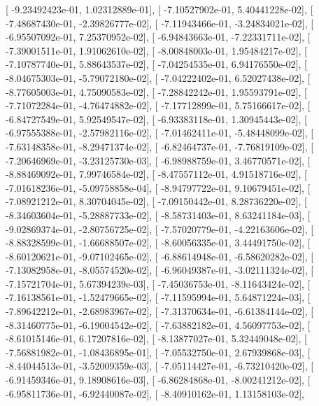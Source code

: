 \documentclass{article}
\begin{document}
       [ -9.23492423e-01,   1.02312889e-01],
       [ -7.10527902e-01,   5.40441228e-02],
       [ -7.48687430e-01,  -2.39826777e-02],
       [ -7.11943466e-01,  -3.24834021e-02],
       [ -6.95507092e-01,   7.25370952e-02],
       [ -6.94843663e-01,  -7.22331711e-02],
       [ -7.39001511e-01,   1.91062610e-02],
       [ -8.00848003e-01,   1.95484217e-02],
       [ -7.10787740e-01,   5.88643537e-02],
       [ -7.04254535e-01,   6.94176550e-02],
       [ -8.04675303e-01,  -5.79072180e-02],
       [ -7.04222402e-01,   6.52027438e-02],
       [ -8.77605003e-01,   4.75090583e-02],
       [ -7.28842242e-01,   1.95593791e-02],
       [ -7.71072284e-01,  -4.76474882e-02],
       [ -7.17712899e-01,   5.75166617e-02],
       [ -6.84727549e-01,   5.92549547e-02],
       [ -6.93383118e-01,   1.30945443e-02],
       [ -6.97555388e-01,  -2.57982116e-02],
       [ -7.01462411e-01,  -5.48448099e-02],
       [ -7.63148358e-01,  -8.29471374e-02],
       [ -6.82464737e-01,  -7.76819109e-02],
       [ -7.20646969e-01,  -3.23125730e-03],
       [ -6.98988759e-01,   3.46770571e-02],
       [ -8.88469092e-01,   7.99746584e-02],
       [ -8.47557112e-01,   4.91518716e-02],
       [ -7.01618236e-01,  -5.09758858e-04],
       [ -8.94797722e-01,   9.10679451e-02],
       [ -7.08921212e-01,   8.30704045e-02],
       [ -7.09150442e-01,   8.28736220e-02],
       [ -8.34603604e-01,  -5.28887733e-02],
       [ -8.58731403e-01,   8.63241184e-03],
       [ -9.02869374e-01,  -2.80756725e-02],
       [ -7.57020779e-01,  -4.22163606e-02],
       [ -8.88328599e-01,  -1.66688507e-02],
       [ -8.60056335e-01,   3.44491750e-02],
       [ -8.60120621e-01,  -9.07102465e-02],
       [ -6.88614948e-01,  -6.58620282e-02],
       [ -7.13082958e-01,  -8.05574520e-02],
       [ -6.96049387e-01,  -3.02111324e-02],
       [ -7.15721704e-01,   5.67394239e-03],
       [ -7.45036753e-01,  -8.11643424e-02],
       [ -7.16138561e-01,  -1.52479665e-02],
       [ -7.11595994e-01,   5.64871224e-03],
       [ -7.89642212e-01,  -2.68983967e-02],
       [ -7.31370634e-01,  -6.61384144e-02],
       [ -8.31460775e-01,  -6.19004542e-02],
       [ -7.63882182e-01,   4.56097753e-02],
       [ -8.61015146e-01,   6.17207816e-02],
       [ -8.13877027e-01,   5.32449048e-02],
       [ -7.56881982e-01,  -1.08436895e-01],
       [ -7.05532750e-01,   2.67939868e-03],
       [ -8.44044513e-01,  -3.52009359e-03],
       [ -7.05114427e-01,  -6.73210420e-02],
       [ -6.91459346e-01,   9.18908616e-03],
       [ -6.86284868e-01,  -8.00241212e-02],
       [ -6.95811736e-01,  -6.92440087e-02],
       [ -8.40910162e-01,   1.13158103e-02],
\end{document}
